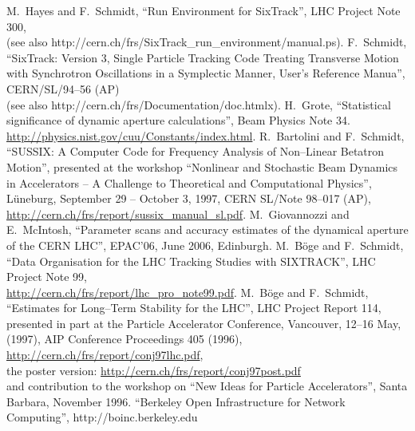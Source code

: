 \documentclass{article}    %
\newcommand{\myhref}[2]{\href{#1}{\color{blue}#2}}
\begin{document}
\begin{thebibliography}{99}
%
 M.~Hayes and F.~Schmidt, ``Run Environment for SixTrack'',
  LHC Project Note 300,\\
  (see also http://cern.ch/frs/SixTrack\_run\_environment/manual.ps).
%
 F.~Schmidt, ``SixTrack: Version 3, Single Particle
  Tracking Code Treating Transverse Motion with Synchrotron
  Oscillations in a Symplectic Manner, User's Reference Manua'',
  CERN/SL/94--56 (AP)\\
  (see also http://cern.ch/frs/Documentation/doc.htmlx).
%
 H.~Grote, ``Statistical significance of dynamic
  aperture calculations'', Beam Physics Note 34.
%
 \myhref{http://physics.nist.gov/cuu/Constants/index.html}
  {http://physics.nist.gov/cuu/Constants/index.html}.
%
 R.~Bartolini and F.~Schmidt, ``SUSSIX: A Computer
  Code for Frequency Analysis of Non--Linear Betatron Motion'',
  presented at the workshop ``Nonlinear and Stochastic Beam Dynamics
  in Accelerators -- A Challenge to Theoretical and Computational
  Physics'', L\"uneburg, September 29 -- October 3, 1997, CERN SL/Note
  98--017 (AP),
  \myhref{http://cern.ch/frs/report/sussix_manual_sl.pdf}
  {http://cern.ch/frs/report/sussix\_manual\_sl.pdf}.
%
M.~Giovannozzi and E.~McIntosh, ``Parameter scans and accuracy estimates
of the dynamical aperture of the CERN LHC'', EPAC'06, June 2006, Edinburgh.
%
 M.~B\"oge and F.~Schmidt, ``Data Organisation for
  the LHC Tracking Studies with SIXTRACK'', LHC Project Note 99,\\
  \myhref{http://cern.ch/frs/report/lhc_pro_note99.pdf}
  {http://cern.ch/frs/report/lhc\_pro\_note99.pdf}.
%
 M.~B\"oge and F.~Schmidt, ``Estimates for Long--Term
  Stability for the LHC'', LHC Project Report 114, presented in part
  at the Particle Accelerator Conference, Vancouver, 12--16 May,
  (1997), AIP Conference Proceedings 405 (1996),
  \myhref{http://cern.ch/frs/report/conj97lhc.pdf}
  {http://cern.ch/frs/report/conj97lhc.pdf},\\
  the poster version:
  \myhref{http://cern.ch/frs/report/conj97post.pdf}
  {http://cern.ch/frs/report/conj97post.pdf} \\
  and contribution to the workshop on ``New Ideas for Particle
  Accelerators'', Santa Barbara, November 1996.
%
 ``Berkeley Open Infrastructure for Network Computing'',
   http://boinc.berkeley.edu
\end{thebibliography}

\clearpage
\end{document}
